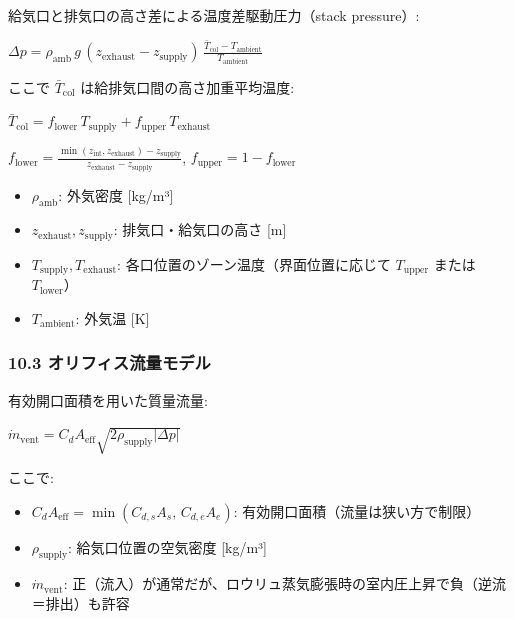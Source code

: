 \documentclass[a4paper,11pt]{article}
\begin{document}
給気口と排気口の高さ差による温度差駆動圧力（stack pressure）:

$
\Delta p = \rho_{\text{amb}} \, g \, (z_{\text{exhaust}} - z_{\text{supply}}) \,
\frac{\bar{T}_{\text{col}} - T_{\text{ambient}}}{T_{\text{ambient}}}
$

ここで $\bar{T}_{\text{col}}$ は給排気口間の高さ加重平均温度:

$
\bar{T}_{\text{col}} = f_{\text{lower}} \, T_{\text{supply}} + f_{\text{upper}} \, T_{\text{exhaust}}
$

$f_{\text{lower}} = \frac{\min(z_{\text{int}}, z_{\text{exhaust}}) - z_{\text{supply}}}{z_{\text{exhaust}} - z_{\text{supply}}}$, \quad
$f_{\text{upper}} = 1 - f_{\text{lower}}$

\begin{itemize} \item $\rho_{\text{amb}}$: 外気密度 [kg/m³] \end{itemize}
\begin{itemize} \item $z_{\text{exhaust}}, z_{\text{supply}}$: 排気口・給気口の高さ [m] \end{itemize}
\begin{itemize} \item $T_{\text{supply}}, T_{\text{exhaust}}$: 各口位置のゾーン温度（界面位置に応じて $T_{\text{upper}}$ または $T_{\text{lower}}$） \end{itemize}
\begin{itemize} \item $T_{\text{ambient}}$: 外気温 [K] \end{itemize}

\subsubsection{10.3 オリフィス流量モデル}

有効開口面積を用いた質量流量:

$
\dot{m}_{\text{vent}} = C_d A_{\text{eff}} \sqrt{2 \rho_{\text{supply}} |\Delta p|}
$

ここで:

\begin{itemize} \item $C_d A_{\text{eff}} = \min(C_{d,s} A_s, \, C_{d,e} A_e)$: 有効開口面積（流量は狭い方で制限） \end{itemize}
\begin{itemize} \item $\rho_{\text{supply}}$: 給気口位置の空気密度 [kg/m³] \end{itemize}
\begin{itemize} \item $\dot{m}_{\text{vent}}$: 正（流入）が通常だが、ロウリュ蒸気膨張時の室内圧上昇で負（逆流＝排出）も許容 \end{itemize}
\end{document}
